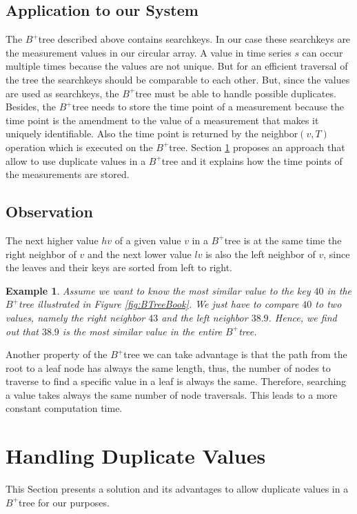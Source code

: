 \documentclass[abstracton,12pt]{scrreprt}
\newtheorem{example}{Example}
\begin{document}
\subsection{Application to our System}
The $B^+$tree described above contains searchkeys. In our case these searchkeys are the measurement values in our circular array. A value in time series $s$ can occur multiple times because the values are not unique. But for an efficient traversal of the tree the searchkeys should be comparable to each other. But, since the values are used as searchkeys, the $B^+$tree must be able to handle possible duplicates. Besides, the $B^+$tree needs to store the time point of a measurement because the time point is the amendment to the value of a measurement that makes it uniquely identifiable. Also the time point  is returned by the neighbor$(v,T)$ operation which is executed on the $B^+$tree. Section \ref{sec:allowDV} proposes an approach that allow to use duplicate values in a $B^+$tree and it explains how the time points of the measurements are stored. 

\subsection{Observation}
The next higher value $hv$ of a given value $v$ in a $B^+$tree is at the same time the right neighbor of $v$ and the next lower value $lv$ is also the left neighbor of $v$, since the leaves and their keys are sorted from left to right.
\begin{example}
	Assume we want to know the most similar value to the key $40$ in the $B^+$tree illustrated in Figure \ref{fig:BTreeBook}. We just have to compare $40$ to two values, namely the right neighbor $43$ and the left neighbor $38.9$. Hence, we find out that $38.9$ is the most similar value in the entire $B^+$tree. 
\end{example}
Another property of the $B^+$tree we can take advantage is that the path from the root to a leaf node has always the same length, thus, the number of nodes to traverse to find a specific value in a leaf is always the same. Therefore, searching a value takes always the same number of node traversals. This leads to a more constant computation time. 


\section{Handling Duplicate Values}
\label{sec:allowDV}
This Section presents a solution and its advantages to allow duplicate values in a $B^+$tree for our purposes.
\end{document}

